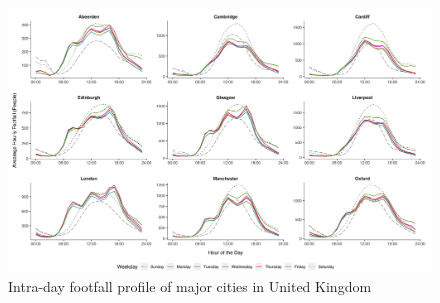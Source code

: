 \begin{figure}
  \forcerectofloat
  \includegraphics[trim={0 10 0 0},clip]{images/applications-city-profiles.png}
  \caption{Intra-day footfall profile of major cities in United Kingdom}
  \label{figure:applications:cities:month}
\end{figure}


